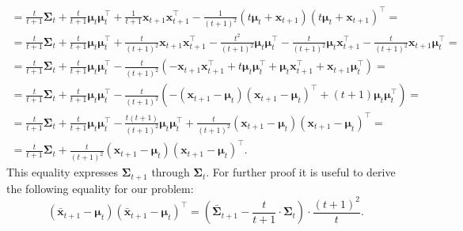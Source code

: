 \documentclass{article}
\begin{document}
{\begin{enumerate}
\begin{gather*}
		= \frac{t}{t+1}\mathbf{\Sigma}_t + \frac{t}{t+1}\boldsymbol{\mu}_{t} \boldsymbol{\mu}_{t}^\intercal + \frac{1}{t+1} \mathbf{x}_{t+1} \mathbf{x}_{t+1}^\intercal - \frac{1}{(t+1)^2} (t \boldsymbol{\mu}_t + \mathbf{x}_{t+1})(t \boldsymbol{\mu}_t + \mathbf{x}_{t+1})^\intercal =\\
		= \frac{t}{t+1}\mathbf{\Sigma}_t + \frac{t}{t+1}\boldsymbol{\mu}_{t} \boldsymbol{\mu}_{t}^\intercal + \frac{t}{(t+1)^2} \mathbf{x}_{t+1} \mathbf{x}_{t+1}^\intercal - \frac{t^2}{(t+1)^2}\boldsymbol{\mu}_{t} \boldsymbol{\mu}_{t}^\intercal - \frac{t}{(t+1)^2}\boldsymbol{\mu}_{t} \mathbf{x}_{t+1}^\intercal - \frac{t}{(t+1)^2}\mathbf{x}_{t+1} \boldsymbol{\mu}_{t}^\intercal =\\
		= \frac{t}{t+1}\mathbf{\Sigma}_t + \frac{t}{t+1}\boldsymbol{\mu}_{t} \boldsymbol{\mu}_{t}^\intercal - \frac{t}{(t+1)^2} \left( -\mathbf{x}_{t+1} \mathbf{x}_{t+1}^\intercal + t\boldsymbol{\mu}_{t} \boldsymbol{\mu}_{t}^\intercal + \boldsymbol{\mu}_{t} \mathbf{x}_{t+1}^\intercal + \mathbf{x}_{t+1} \boldsymbol{\mu}_{t}^\intercal \right) =\\
		= \frac{t}{t+1}\mathbf{\Sigma}_t + \frac{t}{t+1}\boldsymbol{\mu}_{t} \boldsymbol{\mu}_{t}^\intercal - \frac{t}{(t+1)^2} \left( -(\mathbf{x}_{t+1}-\boldsymbol{\mu}_t)(\mathbf{x}_{t+1}-\boldsymbol{\mu}_t)^\intercal + (t+1)\boldsymbol{\mu}_{t} \boldsymbol{\mu}_{t}^\intercal \right) =\\
		= \frac{t}{t+1}\mathbf{\Sigma}_t + \frac{t}{t+1}\boldsymbol{\mu}_{t} \boldsymbol{\mu}_{t}^\intercal - \frac{t(t+1)}{(t+1)^2}\boldsymbol{\mu}_{t} \boldsymbol{\mu}_{t}^\intercal + \frac{t}{(t+1)^2}(\mathbf{x}_{t+1}-\boldsymbol{\mu}_t)(\mathbf{x}_{t+1}-\boldsymbol{\mu}_t)^\intercal =\\
		= \frac{t}{t+1}\mathbf{\Sigma}_t + \frac{t}{(t+1)^2}(\mathbf{x}_{t+1}-\boldsymbol{\mu}_t)(\mathbf{x}_{t+1}-\boldsymbol{\mu}_t)^\intercal.
	\end{gather*}
	This equality expresses $\mathbf{\Sigma}_{t+1}$ through $\mathbf{\Sigma}_t$. For further proof it is useful to derive the following equality for our problem: \[(\bar{\mathbf{x}}_{t+1}-\boldsymbol{\mu}_t)(\bar{\mathbf{x}}_{t+1}-\boldsymbol{\mu}_t)^\intercal = \left(\bar{\mathbf{\Sigma}}_{t+1} - \frac{t}{t+1} \cdot \mathbf{\Sigma}_t \right) \cdot \frac{(t+1)^2}{t}.\]
	

\end{enumerate}}
\end{document}
